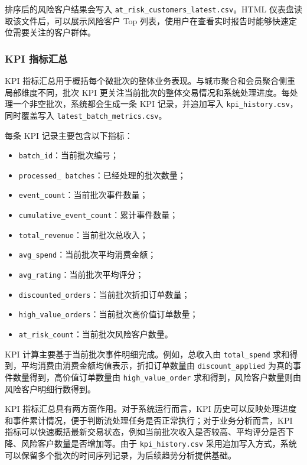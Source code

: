 \documentclass[12pt,hyperref,a4paper,UTF8]{ctexart}
\begin{document}
排序后的风险客户结果会写入 \texttt{at\_risk\_customers\_latest.csv}。HTML 仪表盘读取该文件后，可以展示风险客户 Top 列表，使用户在查看实时报告时能够快速定位需要关注的客户群体。

\subsubsection{KPI 指标汇总}

KPI 指标汇总用于概括每个微批次的整体业务表现。与城市聚合和会员聚合侧重局部维度不同，批次 KPI 更关注当前批次的整体交易情况和系统处理进度。每处理一个非空批次，系统都会生成一条 KPI 记录，并追加写入 \texttt{kpi\_history.csv}，同时覆盖写入 \texttt{latest\_batch\_metrics.csv}。

每条 KPI 记录主要包含以下指标：
\begin{itemize}
    \item \texttt{batch\_id}：当前批次编号；
    \item \texttt{processed\_ batches}：已经处理的批次数量；
    \item \texttt{event\_count}：当前批次事件数量；
    \item \texttt{cumulative\_event\_count}：累计事件数量；
    \item \texttt{total\_revenue}：当前批次总收入；
    \item \texttt{avg\_spend}：当前批次平均消费金额；
    \item \texttt{avg\_rating}：当前批次平均评分；
    \item \texttt{discounted\_orders}：当前批次折扣订单数量；
    \item \texttt{high\_value\_orders}：当前批次高价值订单数量；
    \item \texttt{at\_risk\_count}：当前批次风险客户数量。
\end{itemize}

KPI 计算主要基于当前批次事件明细完成。例如，总收入由 \texttt{total\_spend} 求和得到，平均消费由消费金额均值表示，折扣订单数量由 \texttt{discount\_applied} 为真的事件数量得到，高价值订单数量由 \texttt{high\_value\_order} 求和得到，风险客户数量则由风险客户明细行数得到。

KPI 指标汇总具有两方面作用。对于系统运行而言，KPI 历史可以反映处理进度和事件累计情况，便于判断流处理任务是否正常执行；对于业务分析而言，KPI 指标可以快速概括最新交易状态，例如当前批次收入是否较高、平均评分是否下降、风险客户数量是否增加等。由于 \texttt{kpi\_history.csv} 采用追加写入方式，系统可以保留多个批次的时间序列记录，为后续趋势分析提供基础。
\end{document}
